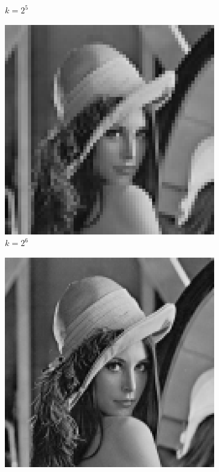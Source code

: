 \begin{figure}[H]
\begin{subfigure}[b]{0.3\textwidth}
        \caption{$k = 2^5$}
    \end{subfigure}
    \begin{subfigure}[b]{0.3\textwidth}
        \centering
        \includegraphics[width=\textwidth]{problem1/image_lena_24bit_64.bmp}
        \caption{$k = 2^6$}
    \end{subfigure}
    \hfill
    \begin{subfigure}[b]{0.3\textwidth}
        \centering
        \includegraphics[width=\textwidth]{problem1/image_lena_24bit_128.bmp}

\end{subfigure}
\end{figure}
